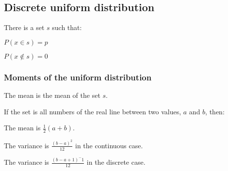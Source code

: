 
\subsection{Discrete uniform distribution}

There is a set \(s\) such that:

\(P(x\in s)=p\)

\(P(x\not\in s)=0\)

\subsubsection{Moments of the uniform distribution}

The mean is the mean of the set \(s\).

If the set is all numbers of the real line between two values, \(a\) and \(b\), then:

The mean is \(\frac{1}{2}(a+b)\).

The variance is \(\frac{(b-a)^2}{12}\) in the continuous case.

The variance is \(\frac{(b-a+1)^-1}{12}\) in the discrete case.

